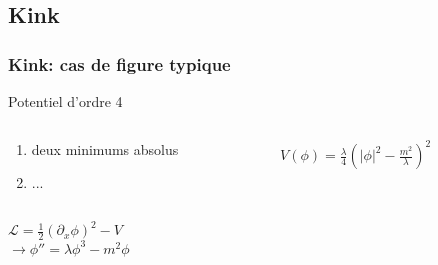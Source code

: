 \documentclass[handout]{beamer}
\begin{document}
\subsection{Kink}
\begin{frame}
\frametitle{Kink: cas de figure typique}
\begin{block}{Potentiel d'ordre 4}

 \begin{columns}
    \begin{column}{.5\linewidth}
    \begin{enumerate}
    \item deux minimums absolus
    \item ...
	\end{enumerate}      
    \end{column}
    \begin{column}{.5\linewidth}
    $V(\phi) = \frac{\lambda}{4}(|\phi|^2 -\frac{m^2}{\lambda})^2$
    \begin{figure}
    \end{figure}
    \end{column}
  \end{columns}

\end{block}
$\mathcal{L} = \frac{1}{2}(\partial_x \phi)^2 - V $ \\
$\rightarrow \phi'' = \lambda \phi^3 - m^2 \phi$ \\
\end{frame}
\end{document}
